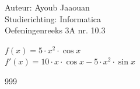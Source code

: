 \documentclass[a4paper]{article}
\begin{document}
\noindent \large Auteur: Ayoub Jaaouan \\
\noindent \large Studierichting: Informatica\\
\noindent \large Oefeningenreeks 3A nr. 10.3\\

\medskip

\normalsize

$f(x) = 5\cdot x^2 \cdot \cos x$ \\

$f'(x)  = 10\cdot x \cdot \cos x - 5\cdot x^2 \cdot \sin x$ \\




\begin{thebibliography}{999}
\end{thebibliography}
\end{document}
